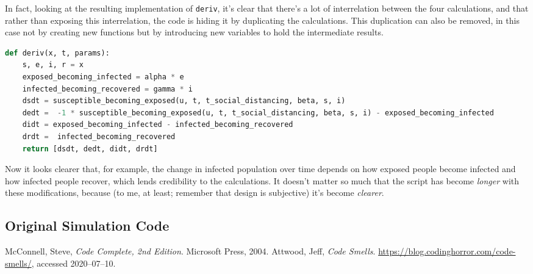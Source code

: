 \documentclass[a4paper]{article}
\begin{document}
In fact, looking at the resulting implementation of \texttt{deriv}, it's clear that there's a lot of interrelation between the four calculations, and that rather than exposing this interrelation, the code is hiding it by duplicating the calculations. This duplication can also be removed, in this case not by creating new functions but by introducing new variables to hold the intermediate results.

\begin{lstlisting}[language=Python]
def deriv(x, t, params):
    s, e, i, r = x
    exposed_becoming_infected = alpha * e
    infected_becoming_recovered = gamma * i
    dsdt = susceptible_becoming_exposed(u, t, t_social_distancing, beta, s, i)
    dedt =  -1 * susceptible_becoming_exposed(u, t, t_social_distancing, beta, s, i) - exposed_becoming_infected
    didt = exposed_becoming_infected - infected_becoming_recovered
    drdt =  infected_becoming_recovered
    return [dsdt, dedt, didt, drdt]
\end{lstlisting}

Now it looks clearer that, for example, the change in infected population over time depends on how exposed people become infected and how infected people recover, which lends credibility to the calculations. It doesn't matter so much that the script has become \emph{longer} with these modifications, because (to me, at least; remember that design is subjective) it's become \emph{clearer}.

\begin{appendices}
\section{Original Simulation Code\label{code-appendix}}



\end{appendices}

\begin{thebibliography}{9}
   McConnell, Steve, \textit{Code Complete, 2nd Edition}. Microsoft Press, 2004.
   Attwood, Jeff, \textit{Code Smells}. \url{https://blog.codinghorror.com/code-smells/}, accessed 2020--07--10.
\end{thebibliography}
\end{document}
